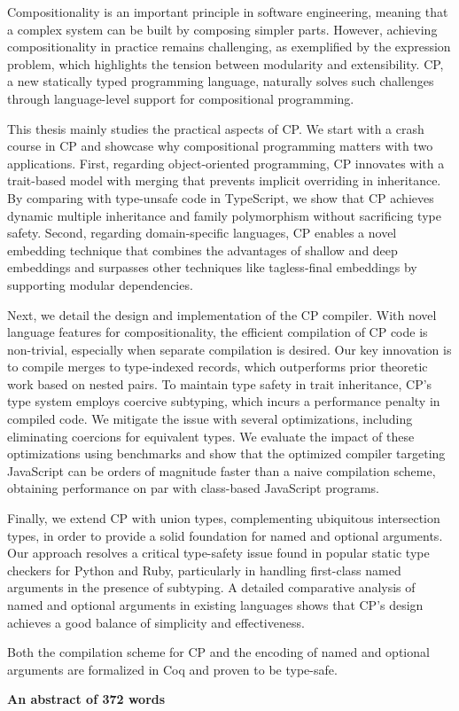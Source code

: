 Compositionality is an important principle in software engineering, meaning that
a complex system can be built by composing simpler parts. However, achieving
compositionality in practice remains challenging, as exemplified by the
expression problem, which highlights the tension between modularity and
extensibility. CP, a new statically typed programming language, naturally solves
such challenges through language-level support for compositional programming.

This thesis mainly studies the practical aspects of CP. We start with a crash
course in CP and showcase why compositional programming matters with two
applications. First, regarding object-oriented programming, CP innovates with a
trait-based model with merging that prevents implicit overriding in inheritance.
By comparing with type-unsafe code in TypeScript, we show that CP achieves
dynamic multiple inheritance and family polymorphism without sacrificing type
safety. Second, regarding domain-specific languages, CP enables a novel
embedding technique that combines the advantages of shallow and deep embeddings
and surpasses other techniques like tagless-final embeddings by supporting
modular dependencies.

Next, we detail the design and implementation of the CP compiler. With novel
language features for compositionality, the efficient compilation of CP code is
non-trivial, especially when separate compilation is desired. Our key innovation
is to compile merges to type-indexed records, which outperforms prior theoretic
work based on nested pairs. To maintain type safety in trait inheritance, CP's
type system employs coercive subtyping, which incurs a performance penalty in
compiled code. We mitigate the issue with several optimizations, including
eliminating coercions for equivalent types. We evaluate the impact of these
optimizations using benchmarks and show that the optimized compiler targeting
JavaScript can be orders of magnitude faster than a naive compilation scheme,
obtaining performance on par with class-based JavaScript programs.

Finally, we extend CP with union types, complementing ubiquitous intersection
types, in order to provide a solid foundation for named and optional arguments.
Our approach resolves a critical type-safety issue found in popular static type
checkers for Python and Ruby, particularly in handling first-class named
arguments in the presence of subtyping. A detailed comparative analysis of named
and optional arguments in existing languages shows that CP's design achieves a
good balance of simplicity and effectiveness.

Both the compilation scheme for CP and the encoding of named and optional
arguments are formalized in Coq and proven to be type-safe.

\vspace{1.5\baselineskip}

\noindent\makebox[\linewidth]{\rule{0.7\textwidth}{0.4pt}}

\begin{center}
\textbf{An abstract of 372 words}
\end{center}
